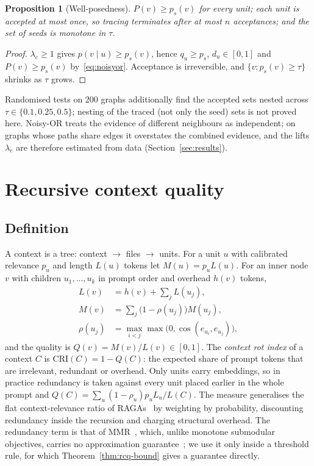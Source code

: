 \documentclass[10pt,twocolumn]{article}
\newtheorem{proposition}[theorem]{Proposition}
\theoremstyle{definition}
\theoremstyle{remark}
\begin{document}
\begin{proposition}[Well-posedness]
$P(v)\ge p_s(v)$ for every unit; each unit is accepted at most once, so tracing terminates after at most $n$ acceptances; and the set of seeds is monotone in $\tau$.
\end{proposition}
\begin{proof}
$\lambda_e\ge1$ gives $p(v\mid u)\ge p_s(v)$, hence $q_u\ge p_s$, $d_u\in[0,1]$ and $P(v)\ge p_s(v)$ by~\eqref{eq:noisyor}. Acceptance is irreversible, and $\{v:p_s(v)\ge\tau\}$ shrinks as $\tau$ grows.
\end{proof}
Randomised tests on 200 graphs additionally find the accepted sets nested across $\tau\in\{0.1,0.25,0.5\}$; nesting of the traced (not only the seed) sets is not proved here.
Noisy-OR treats the evidence of different neighbours as independent; on graphs whose paths share edges it overstates the combined evidence, and the lifts $\lambda_e$ are therefore estimated from data (Section~\ref{sec:results}).

\section{Recursive context quality}\label{sec:rcq}

\subsection{Definition}
A context is a tree: context $\to$ files $\to$ units.
For a unit $u$ with calibrated relevance $p_u$ and length $L(u)$ tokens let $M(u)=p_uL(u)$.
For an inner node $v$ with children $u_1,\dots,u_k$ in prompt order and overhead $h(v)$ tokens,
\begin{align}
L(v)&=h(v)+\textstyle\sum_j L(u_j),\\
M(v)&=\textstyle\sum_j\bigl(1-\rho(u_j)\bigr)M(u_j),\\
\rho(u_j)&=\max_{i<j}\max\bigl(0,\cos(e_{u_i},e_{u_j})\bigr),
\end{align}
and the quality is $Q(v)=M(v)/L(v)\in[0,1]$.
The \emph{context rot index} of a context $C$ is $\mathrm{CRI}(C)=1-Q(C)$: the expected share of prompt tokens that are irrelevant, redundant or overhead.
Only units carry embeddings, so in practice redundancy is taken against every unit placed earlier in the whole prompt and $Q(C)=\sum_u(1-\rho_u)p_uL_u/L(C)$.
The measure generalises the flat context-relevance ratio of RAGAs~\cite{es2023ragas} by weighting by probability, discounting redundancy inside the recursion and charging structural overhead.
The redundancy term is that of MMR~\cite{carbonell1998mmr}, which, unlike monotone submodular objectives, carries no approximation guarantee~\cite{lin2011submodular}; we use it only inside a threshold rule, for which Theorem~\ref{thm:rcq-bound} gives a guarantee directly.
\end{document}
